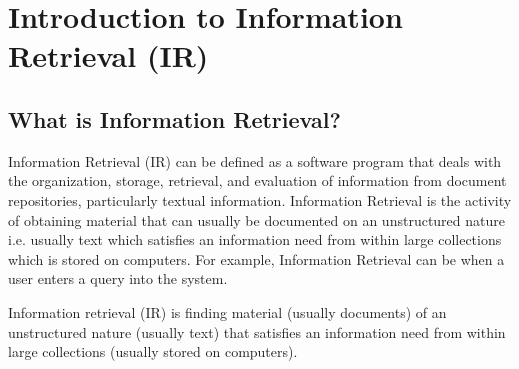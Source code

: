 \chapter{Introduction to Information Retrieval (IR)}

\section{What is Information Retrieval?}
Information Retrieval (IR) can be defined as a software program that deals with the organization, storage, retrieval, and evaluation of information from document repositories, particularly textual information. Information Retrieval is the activity of obtaining material that can usually be documented on an unstructured nature i.e. usually text which satisfies an information need from within large collections which is stored on computers. For example, Information Retrieval can be when a user enters a query into the system. \cite{gfg-what-is-ir}



Information retrieval (IR) is finding material (usually documents) of an unstructured nature (usually text) that satisfies an information need from within large collections (usually stored on computers). \cite{ir-1}


